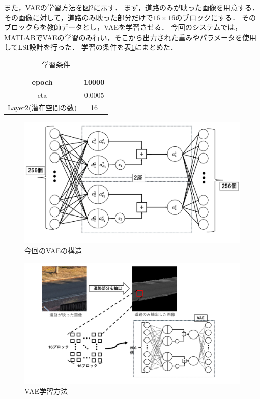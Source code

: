 \documentclass[paper]{ieicej}
\begin{document}
また，VAEの学習方法を図\ref{fig:2-2-2-2}に示す．
まず，道路のみが映った画像を用意する．
その画像に対して，道路のみ映った部分だけで$16\times16$のブロックにする．
そのブロックらを教師データとし，VAEを学習させる．
今回のシステムでは，MATLABでVAEの学習のみ行い，そこから出力された重みやパラメータを使用してLSI設計を行った．
学習の条件を表\ref{tb:2}にまとめた．

\begin{table}[b]
  \centering
  \caption{学習条件}
  \small
  \begin{tabular}{|c|c|} \hline
    epoch & 10000 \\ \hline
    eta & 0.0005 \\ \hline
    Layer2(潜在空間の数) & 16 \\ \hline
  \end{tabular}
  \label{tb:2}
\end{table}


\begin{figure}[tb]
  \begin{center}
    \includegraphics[width=0.98\columnwidth]{figures/VAE_1.bmp}
  \end{center}
  \caption{今回のVAEの構造}
  \label{fig:2-2-2-1}
\end{figure}

\begin{figure}[tb]
  \begin{center}
    \includegraphics[width=0.98\columnwidth]{figures/VAE_2.bmp}
  \end{center}
  \caption{VAE学習方法}
  \label{fig:2-2-2-2}
\end{figure}
\end{document}
